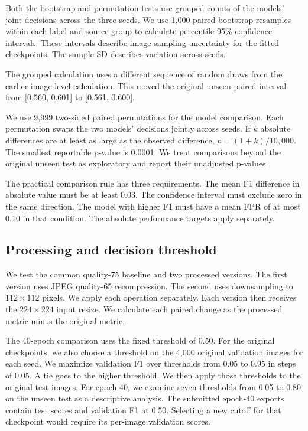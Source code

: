 \documentclass[11pt,a4paper]{article}
\begin{document}
Both the bootstrap and permutation tests use grouped counts of the models' joint decisions across the three seeds. We use 1,000 paired bootstrap resamples within each label and source group to calculate percentile 95\% confidence intervals. These intervals describe image-sampling uncertainty for the fitted checkpoints. The sample SD describes variation across seeds.

The grouped calculation uses a different sequence of random draws from the earlier image-level calculation. This moved the original unseen paired interval from [0.560, 0.601] to [0.561, 0.600].

We use 9,999 two-sided paired permutations for the model comparison. Each permutation swaps the two models' decisions jointly across seeds. If $k$ absolute differences are at least as large as the observed difference, $p=(1+k)/10,000$. The smallest reportable p-value is 0.0001. We treat comparisons beyond the original unseen test as exploratory and report their unadjusted p-values.

The practical comparison rule has three requirements. The mean F1 difference in absolute value must be at least 0.03. The confidence interval must exclude zero in the same direction. The model with higher F1 must have a mean FPR of at most 0.10 in that condition. The absolute performance targets apply separately.

\subsection{Processing and decision threshold}
We test the common quality-75 baseline and two processed versions. The first version uses JPEG quality-65 recompression. The second uses downsampling to $112\times112$ pixels. We apply each operation separately. Each version then receives the $224\times224$ input resize. We calculate each paired change as the processed metric minus the original metric.

The 40-epoch comparison uses the fixed threshold of 0.50. For the original checkpoints, we also choose a threshold on the 4,000 original validation images for each seed. We maximize validation F1 over thresholds from 0.05 to 0.95 in steps of 0.05. A tie goes to the higher threshold. We then apply those thresholds to the original test images. For epoch 40, we examine seven thresholds from 0.05 to 0.80 on the unseen test as a descriptive analysis. The submitted epoch-40 exports contain test scores and validation F1 at 0.50. Selecting a new cutoff for that checkpoint would require its per-image validation scores.
\FloatBarrier
\end{document}
